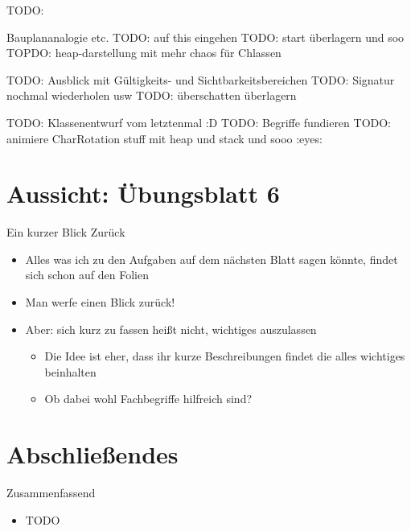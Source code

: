 
\begin{frame}{TODO:}

    Bauplananalogie etc.
    TODO: auf this eingehen TODO: start überlagern  und soo
    TOPDO: heap-darstellung mit mehr chaos für Chlassen

    TODO: Ausblick mit Gültigkeits- und Sichtbarkeitsbereichen
    TODO: Signatur nochmal wiederholen usw
    TODO: überschatten überlagern

    TODO: Klassenentwurf vom letztenmal :D
    TODO: Begriffe fundieren
    TODO: animiere CharRotation stuff mit heap und stack und sooo :eyes:
\end{frame}

\iffull
{}
\section{Aussicht: Übungsblatt 6}
\begin{frame}{Ein kurzer Blick Zurück}
    \begin{itemize}[<+(1)->]
        \itemsep5pt
        \item Alles was ich zu den Aufgaben auf dem nächsten Blatt sagen könnte, findet sich schon auf den Folien
        \item Man werfe einen Blick zurück!
        \item Aber: sich kurz zu fassen heißt nicht, wichtiges auszulassen \begin{itemize}
            \item Die Idee ist eher, dass ihr kurze Beschreibungen findet die alles wichtiges beinhalten
            \item Ob dabei wohl Fachbegriffe hilfreich sind?
        \end{itemize}
    \end{itemize}
\end{frame}
\fi



\section{Abschließendes}
{\SummaryFrame
\begin{frame}[t]{Zusammenfassend}
\pause \printBibCommand
\vfill\vfill %
\begin{itemize}[<+(1)->]
    \itemsep6.5pt
    \item TODO
\end{itemize}
\end{frame}
}




\iffull\fi
